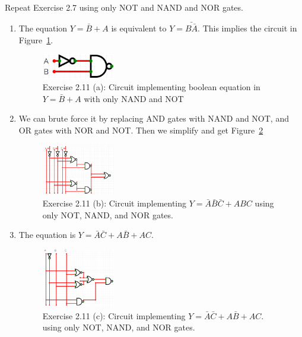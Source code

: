 \documentclass[12pt]{article}
\newenvironment{ex}[2][Exercise]{\begin{trivlist}
		\item[\hskip \labelsep {\bfseries #1}\hskip \labelsep {\bfseries #2.}]}{\end{trivlist}}
\newenvironment{sol}[1][Solution]{\begin{trivlist}
		\item[\hskip \labelsep {\bfseries #1:}]}{\end{trivlist}}
\begin{document}
\begin{ex}{2.11}
	Repeat Exercise 2.7 using only NOT and NAND and NOR gates.
\end{ex}

\begin{sol}
	\begin{enumerate}[label=(\alph*)]
		\item The equation $Y=\bar{B}+A$ is equivalent to $Y=\bar{B\bar{A}}$. This implies the circuit in
		Figure~\ref{02-11a}.
		\begin{figure}
			\centering
			\includegraphics[width=0.3\textwidth]{02-11a-circuit}
			\caption{Exercise 2.11 (a): Circuit implementing boolean equation in $Y=\bar{B}+A$ with only NAND and NOT}
			\label{02-11a}
		\end{figure}
		\item We can brute force it by replacing AND gates with NAND and NOT, and OR gates with NOR and NOT. Then we simplify and get Figure~\ref{02-11b}
		\begin{figure}
			\centering
			\includegraphics[width=0.3\textwidth]{02-11b-circuit}
			\caption{Exercise 2.11 (b): Circuit implementing $Y=\bar{A}\bar{B}\bar{C}+ABC$ using only NOT, NAND, and NOR gates.}
			\label{02-11b}
		\end{figure}
		\item The equation is $Y=\bar{A}\bar{C}+A\bar{B}+AC$.
		\begin{figure}
			\centering
			\includegraphics[width=0.3\textwidth]{02-11c-circuit}
			\caption{Exercise 2.11 (c): Circuit implementing $Y=\bar{A}\bar{C}+A\bar{B}+AC$. using only NOT, NAND, and NOR gates.}
			\label{02-11c}
		\end{figure}

\end{enumerate}
\end{sol}
\end{document}
